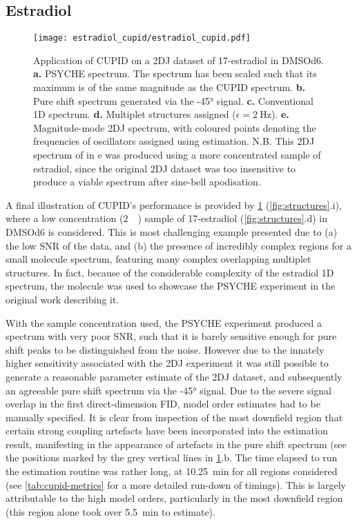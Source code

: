 \subsection{Estradiol}
\begin{figure}
    \texttt{[image: estradiol\_cupid/estradiol\_cupid.pdf]}%
    \caption[
        Application of \acs{CUPID} on a 17\textbeta-estradiol dataset.
    ]{
        Application of \acs{CUPID} on a \ac{2DJ} dataset of 17\textbeta-estradiol
        in \acs{DMSOd6}.
        \textbf{a.} \acs{PSYCHE} spectrum.
        The spectrum has been scaled such that its maximum is of the same
        magnitude as the \acs{CUPID} spectrum.
        \textbf{b.} Pure shift spectrum generated via the \ang{-45} signal.
        \textbf{c.} Conventional \ac{1D} spectrum.
        \textbf{d.} Multiplet structures assigned ($\epsilon =
        \qty{2}{\hertz}$).
        \textbf{e.} Magnitude-mode \ac{2DJ} spectrum, with coloured points
        denoting the frequencies of oscillators assigned using estimation.
        N.B. This \ac{2DJ} spectrum of in e was produced using a more
        concentrated sample of estradiol, since the original \ac{2DJ} dataset
        was too insensitive to produce a viable spectrum after sine-bell
        apodisation.
    }
    \label{fig:estradiol-cupid}%
\end{figure}

A final illustration of \ac{CUPID}'s performance is provided by
\cref{fig:estradiol-cupid} (\cref{fig:structures}.i),
where a low concentration (\qty{2}{\milli\molar}) sample of
17\textbeta-estradiol (\cref{fig:structures}.d) in \acs{DMSOd6} is
considered. This is most challenging example presented due
to (a) the low \ac{SNR} of the data, and (b) the presence of incredibly complex
regions for a small molecule spectrum, featuring many complex overlapping
multiplet structures. In fact, because of the considerable complexity
of the estradiol \ac{1D} spectrum, the molecule was used to showcase the
\ac{PSYCHE} experiment in the original work describing
it\cite{Foroozandeh2014}.

With the sample concentration used, the
\ac{PSYCHE} experiment produced a spectrum with very poor
\ac{SNR}, such that it is barely sensitive enough for pure shift peaks to be
distinguished from the noise. However due to the innately higher
sensitivity associated with the \ac{2DJ} experiment it was still possible to
generate a reasonable parameter estimate of the \ac{2DJ} dataset, and
subsequently an agreeable pure shift spectrum via the \ang{-45} signal. Due to
the severe signal overlap in the first
direct-dimension \ac{FID}, model order estimates had to be
manually specified. It is clear from inspection of the most downfield region
that certain strong coupling artefacts have been incorporated into the
estimation result, manifesting in the appearance of artefacts in the pure shift
spectrum (see the positions marked by the grey vertical lines in
\cref{fig:estradiol-cupid}.b.
The time elapsed to run the estimation routine was rather
long, at \qty{10.25}{\minute} for all regions considered (see
\cref{tab:cupid-metrics} for a more detailed run-down of timings). This is
largely attributable to the high model orders, particularly in the most
downfield region (this region alone took over \qty{5.5}{\minute} to estimate).
